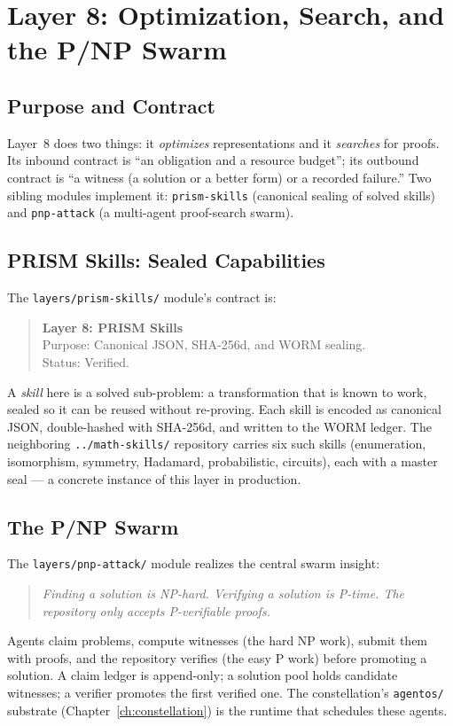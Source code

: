 \chapter{Layer 8: Optimization, Search, and the P/NP Swarm}
\label{ch:pnp}

\section{Purpose and Contract}
\label{sec:pnp-purpose}

Layer~8 does two things: it \emph{optimizes} representations and it
\emph{searches} for proofs. Its inbound contract is ``an obligation and a
resource budget''; its outbound contract is ``a witness (a solution or a
better form) or a recorded failure.'' Two sibling modules implement it:
\texttt{prism-skills} (canonical sealing of solved skills) and
\texttt{pnp-attack} (a multi-agent proof-search swarm).

\section{PRISM Skills: Sealed Capabilities}
\label{sec:pnp-prism}

The \texttt{layers/prism-skills/} module's contract is:
\begin{quote}
\textbf{Layer 8: PRISM Skills} \\
Purpose: Canonical JSON, SHA-256d, and WORM sealing. \\
Status: Verified.
\end{quote}
A \emph{skill} here is a solved sub-problem: a transformation that is known to
work, sealed so it can be reused without re-proving. Each skill is encoded as
canonical JSON, double-hashed with SHA-256d, and written to the WORM ledger.
The neighboring \texttt{../math-skills/} repository carries six such skills
(enumeration, isomorphism, symmetry, Hadamard, probabilistic, circuits), each
with a master seal --- a concrete instance of this layer in production.

\section{The P/NP Swarm}
\label{sec:pnp-swarm}

The \texttt{layers/pnp-attack/} module realizes the central swarm insight:
\begin{quote}
\itshape Finding a solution is NP-hard. Verifying a solution is P-time. The
repository only accepts P-verifiable proofs.
\end{quote}
Agents claim problems, compute witnesses (the hard NP work), submit them with
proofs, and the repository verifies (the easy P work) before promoting a
solution. A claim ledger is append-only; a solution pool holds candidate
witnesses; a verifier promotes the first verified one. The constellation's
\texttt{agentos/} substrate (Chapter~\ref{ch:constellation}) is the runtime
that schedules these agents.

